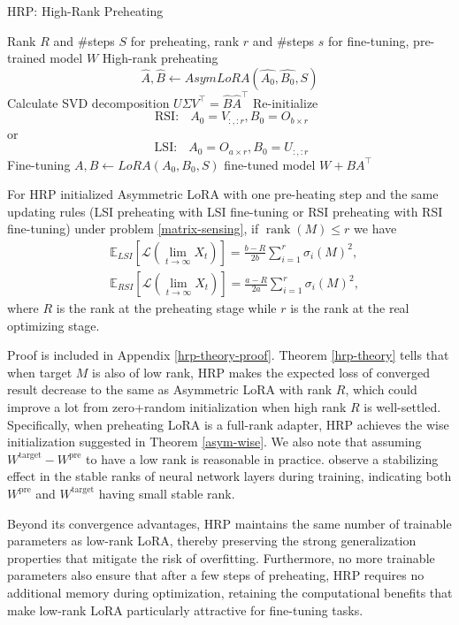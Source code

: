 \begin{algorithm}
\label{hrp-alg}
\caption{HRP: High-Rank Preheating}
\begin{algorithmic}[1]
\INPUT Rank $R$ and $\#$steps $S$ for preheating, rank $r$ and $\#$steps $s$ for fine-tuning, pre-trained model $W$
\STATE High-rank preheating $$\hat{A}, \hat{B}\leftarrow AsymLoRA(\hat{A_0}, \hat{B_0}, S)$$
\STATE Calculate SVD decomposition $U\Sigma V^\top=\hat{B}\hat{A}^\top$
\STATE Re-initialize $$\operatorname{RSI:}~~~A_0=V_{:,:r}, B_0=O_{b\times r}$$ or $$\operatorname{LSI:}~~~A_0=O_{a\times r}, B_0=U_{:,:r}$$
\STATE Fine-tuning $A, B\leftarrow LoRA(A_0,B_0,S)$
\OUTPUT fine-tuned model $W+BA^\top$
\end{algorithmic}
\end{algorithm}

\begin{theorem}
    \label{hrp-theory}
    For HRP initialized Asymmetric LoRA with one pre-heating step and the same updating rules (LSI preheating with LSI fine-tuning or RSI preheating with RSI fine-tuning) under problem \ref{matrix-sensing}, if $\operatorname{rank}(M)\leq r$ we have
    \begin{align*}
        &\mathbb{E}_{LSI}\left[\mathcal{L}(\lim_{t\to\infty}X_t)\right]=\frac{b-R}{2b}\sum_{i=1}^r\sigma_i(M)^2,\\
        &\mathbb{E}_{RSI}\left[\mathcal{L}(\lim_{t\to\infty}X_t)\right]=\frac{a-R}{2a}\sum_{i=1}^r\sigma_i(M)^2,
    \end{align*}
    where $R$ is the rank at the preheating stage while $r$ is the rank at the real optimizing stage. 
\end{theorem}
Proof is included in Appendix \ref{hrp-theory-proof}. 
Theorem \ref{hrp-theory} tells that when target $M$ is also of low rank, HRP makes the expected loss of converged result decrease to the same as Asymmetric LoRA with rank $R$, which could improve a lot from zero+random initialization when high rank $R$ is well-settled. Specifically, when preheating LoRA is a full-rank adapter, HRP achieves the wise initialization suggested in Theorem \ref{asym-wise}. We also note that assuming $W^{\operatorname{target}}-W^{\operatorname{pre}}$ to have a low rank is reasonable in practice. \citet{wang2021pufferfish,wang2023cuttlefish} observe a stabilizing effect in the stable ranks of neural network layers during training, indicating both $W^{\operatorname{pre}}$ and $W^{\operatorname{target}}$ having small stable rank. 


Beyond its convergence advantages, HRP maintains the same number of trainable parameters as low-rank LoRA, thereby preserving the strong generalization properties that mitigate the risk of overfitting. Furthermore, no more trainable parameters also ensure that after a few steps of preheating, HRP requires no additional memory during optimization, retaining the computational benefits that make low-rank LoRA particularly attractive for fine-tuning tasks.









